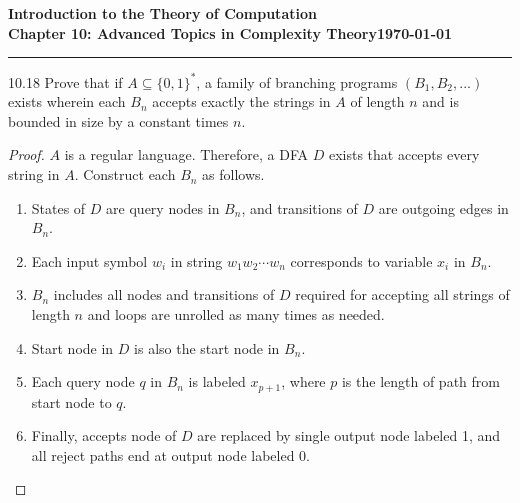 \documentclass[11pt]{article}
\newcommand{\dated}{\today}
\begin{document}
\textbf{Introduction to the Theory of
Computation}\hfill\textbf{\myname}\\[0.01in]
\textbf{Chapter 10: Advanced Topics in Complexity Theory}\hfill\textbf{\dated}\\
\smallskip\hrule\bigskip

\begin{problem}{10.18}
Prove that if $A \subseteq \{0, 1\}^*$, a family of branching programs $(B_1,B_2, . . .)$ exists wherein each $B_n$ accepts exactly the strings in $A$ of length $n$ and is bounded in size by a constant times $n$.
\end{problem}

\begin{proof}
$A$ is a regular language. Therefore, a DFA $D$ exists that accepts every string in $A$.    Construct each $B_n$ as follows.
\begin{enumerate}
\item States of $D$ are query nodes in $B_n$, and transitions of $D$ are outgoing edges in $B_n$.
\item Each input symbol $w_i$ in string $w_1w_2 \cdots w_n$ corresponds to variable $x_i$ in $B_n$.
\item $B_n$ includes all nodes and transitions of $D$ required for accepting all strings of length $n$ and loops are unrolled as many times as needed.
\item Start node in $D$ is also the start node in $B_n$.
\item Each query node $q$ in $B_n$ is labeled $x_{p + 1}$, where $p$ is the length of path from start node to $q$.
\item Finally, accepts node of $D$ are replaced by single output node labeled 1, and all reject paths end at output node labeled 0.     
\end{enumerate}

\end{proof}
\end{document}
